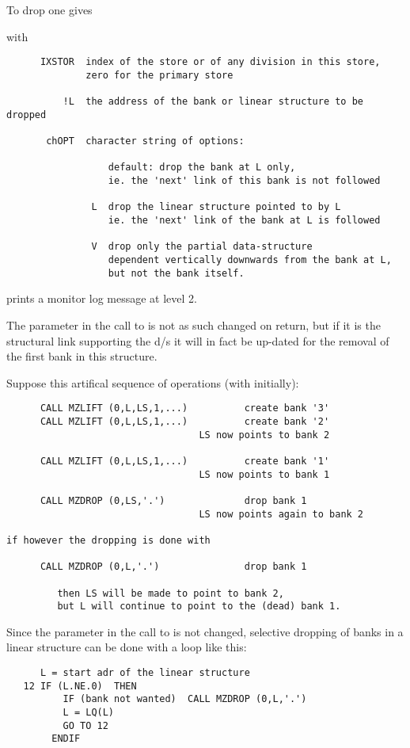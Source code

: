 To drop one gives


with
\begin{verbatim}
      IXSTOR  index of the store or of any division in this store,
              zero for the primary store

          !L  the address of the bank or linear structure to be dropped

       chOPT  character string of options:

                  default: drop the bank at L only,
                  ie. the 'next' link of this bank is not followed

               L  drop the linear structure pointed to by L
                  ie. the 'next' link of the bank at L is followed

               V  drop only the partial data-structure
                  dependent vertically downwards from the bank at L,
                  but not the bank itself.
\end{verbatim} 

 prints a monitor log message at level 2.

The parameter  in the call to  is not as such changed
on return,
but if it is the structural link supporting the d/s it will
in fact be up-dated for the removal of the first bank
in this structure.

Suppose this artifical sequence of operations (with  initially):
\begin{verbatim}
      CALL MZLIFT (0,L,LS,1,...)          create bank '3'
      CALL MZLIFT (0,L,LS,1,...)          create bank '2'
                                  LS now points to bank 2

      CALL MZLIFT (0,L,LS,1,...)          create bank '1'
                                  LS now points to bank 1

      CALL MZDROP (0,LS,'.')              drop bank 1
                                  LS now points again to bank 2

if however the dropping is done with

      CALL MZDROP (0,L,'.')               drop bank 1

         then LS will be made to point to bank 2,
         but L will continue to point to the (dead) bank 1.
\end{verbatim}
Since the parameter  in the call to  is not changed,
selective dropping of banks in a linear structure can be done
with a loop like this:
\begin{verbatim}
      L = start adr of the linear structure
   12 IF (L.NE.0)  THEN
          IF (bank not wanted)  CALL MZDROP (0,L,'.')
          L = LQ(L)
          GO TO 12
        ENDIF
\end{verbatim}

